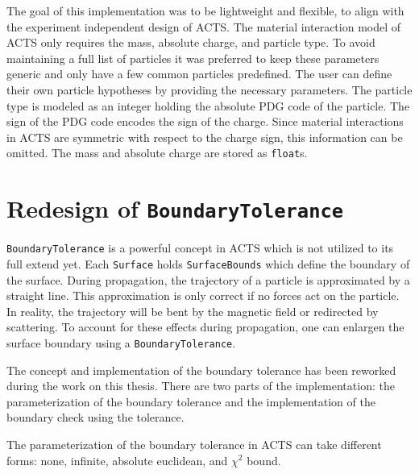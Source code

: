The goal of this implementation was to be lightweight and flexible, to align with the experiment independent design of ACTS. The material interaction model of ACTS only requires the mass, absolute charge, and particle type. To avoid maintaining a full list of particles it was preferred to keep these parameters generic and only have a few common particles predefined. The user can define their own particle hypotheses by providing the necessary parameters. The particle type is modeled as an integer holding the absolute PDG code of the particle. The sign of the PDG code encodes the sign of the charge. Since material interactions in ACTS are symmetric with respect to the charge sign, this information can be omitted. The mass and absolute charge are stored as \texttt{float}s.

\section{Redesign of \texttt{BoundaryTolerance}}

\texttt{BoundaryTolerance} is a powerful concept in ACTS which is not utilized to its full extend yet. Each \texttt{Surface} holds \texttt{SurfaceBounds} which define the boundary of the surface. During propagation, the trajectory of a particle is approximated by a straight line. This approximation is only correct if no forces act on the particle. In reality, the trajectory will be bent by the magnetic field or redirected by scattering. To account for these effects during propagation, one can enlargen the surface boundary using a \texttt{BoundaryTolerance}.

The concept and implementation of the boundary tolerance has been reworked during the work on this thesis. There are two parts of the implementation: the parameterization of the boundary tolerance and the implementation of the boundary check using the tolerance.

The parameterization of the boundary tolerance in ACTS can take different forms: none, infinite, absolute euclidean, and $\chi^2$ bound.

